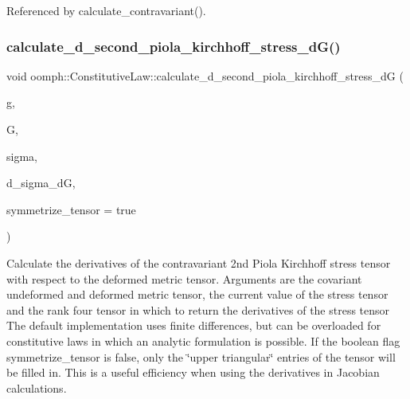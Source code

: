 Referenced by calculate\+\_\+contravariant().

\mbox{\label{classoomph_1_1ConstitutiveLaw_a6076752384082cfa3de3e0cf17daa9aa}} 
\subsubsection{\texorpdfstring{calculate\+\_\+d\+\_\+second\+\_\+piola\+\_\+kirchhoff\+\_\+stress\+\_\+d\+G()}{calculate\_d\_second\_piola\_kirchhoff\_stress\_dG()}\hspace{0.1cm}{\footnotesize\ttfamily [1/3]}}
{\footnotesize\ttfamily void oomph\+::\+Constitutive\+Law\+::calculate\+\_\+d\+\_\+second\+\_\+piola\+\_\+kirchhoff\+\_\+stress\+\_\+dG (\begin{DoxyParamCaption}\item[{const \hyperlink{classoomph_1_1DenseMatrix}{Dense\+Matrix}$<$ double $>$ \&}]{g,  }\item[{const \hyperlink{classoomph_1_1DenseMatrix}{Dense\+Matrix}$<$ double $>$ \&}]{G,  }\item[{const \hyperlink{classoomph_1_1DenseMatrix}{Dense\+Matrix}$<$ double $>$ \&}]{sigma,  }\item[{\hyperlink{classoomph_1_1RankFourTensor}{Rank\+Four\+Tensor}$<$ double $>$ \&}]{d\+\_\+sigma\+\_\+dG,  }\item[{const bool \&}]{symmetrize\+\_\+tensor = {\ttfamily true} }\end{DoxyParamCaption})\hspace{0.3cm}{\ttfamily [virtual]}}



Calculate the derivatives of the contravariant 2nd Piola Kirchhoff stress tensor with respect to the deformed metric tensor. Arguments are the covariant undeformed and deformed metric tensor, the current value of the stress tensor and the rank four tensor in which to return the derivatives of the stress tensor The default implementation uses finite differences, but can be overloaded for constitutive laws in which an analytic formulation is possible. If the boolean flag symmetrize\+\_\+tensor is false, only the \char`\"{}upper  triangular\char`\"{} entries of the tensor will be filled in. This is a useful efficiency when using the derivatives in Jacobian calculations. 

